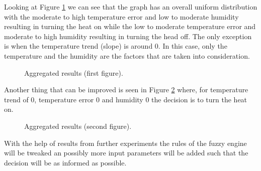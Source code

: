 Looking at Figure \ref{fig:result1} we can see that the graph has an overall uniform distribution with the
moderate to high temperature error and low to moderate humidity resulting in turning the heat on while
the low to moderate temperature error and moderate to high humidity resulting in turning the head off.
The only exception is when the temperature trend (slope) is around 0. In this case, only the temperature and
the humidity are the factors that are taken into consideration.

\begin{figure}[h!]
\label{fig:result1}
\centerline{}
      \caption[Aggregated results (first figure).]{Aggregated results (first figure).}
\label{fig:result1}
\end{figure}

Another thing that can be improved is seen in Figure \ref{fig:result2} where, for temperature trend of 0,
temperature error 0 and humidity 0 the decision is to turn the heat on.

\begin{figure}[h!]
\label{fig:result2}
\centerline{}
      \caption[Aggregated results (second figure).]{Aggregated results (second figure).}
\label{fig:result2}
\end{figure}

With the help of results from further experiments the rules of the fuzzy engine will be tweaked an possibly
more input parameters will be added such that the decision will be as informed as possible.
